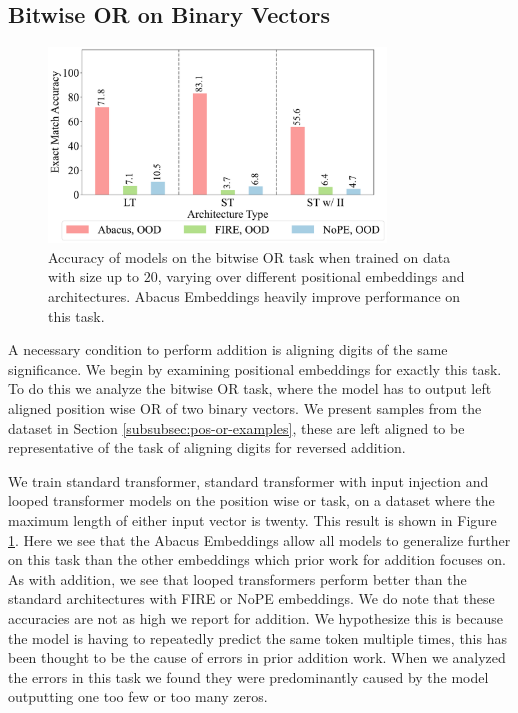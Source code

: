\documentclass{article}
\begin{document}
\subsection{Bitwise OR on Binary Vectors}
\label{app-subsec:or-task}
\begin{figure}[ht!]
    \centering
    \includegraphics[width=0.8\textwidth]{Figures/plot_seven_2_bars.pdf}
    \caption{
    Accuracy of models on the bitwise OR task when trained on data with size up to \(20\), varying over different positional embeddings and architectures.
    Abacus Embeddings heavily improve performance on this task.
    }
    \label{fig:position-or}
\end{figure}

A necessary condition to perform addition is aligning digits of the same significance.
We begin by examining positional embeddings for exactly this task.
To do this we analyze the bitwise OR task, where the model has to output left aligned position wise OR of two binary vectors.
We present samples from the dataset in Section \ref{subsubsec:pos-or-examples}, these are left aligned to be representative of the task of aligning digits for reversed addition.

We train standard transformer, standard transformer with input injection and looped transformer models on the position wise or task, on a dataset where the maximum length of either input vector is twenty.
This result is shown in Figure \ref{fig:position-or}.
Here we see that the Abacus Embeddings allow all models to generalize further on this task than the other embeddings which prior work for addition focuses on.
As with addition, we see that looped transformers perform better than the standard architectures with FIRE or NoPE embeddings.
We do note that these accuracies are not as high we report for addition.
We hypothesize this is because the model is having to repeatedly predict the same token multiple times, this has been thought to be the cause of errors in prior addition work\citep{qian2022limitations}.
When we analyzed the errors in this task we found they were predominantly caused by the model outputting one too few or too many zeros.
\end{document}
